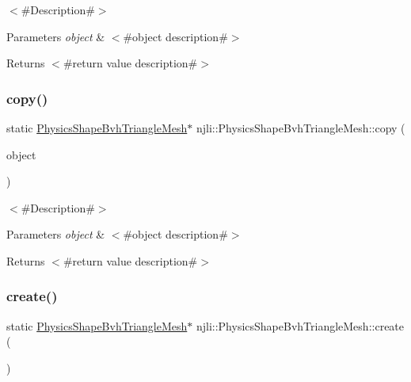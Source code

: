 $<$\#\+Description\#$>$


\begin{DoxyParams}{Parameters}
{\em object} & $<$\#object description\#$>$\\
\hline
\end{DoxyParams}
\begin{DoxyReturn}{Returns}
$<$\#return value description\#$>$ 
\end{DoxyReturn}
\mbox{\label{classnjli_1_1_physics_shape_bvh_triangle_mesh_aea4dfccb4d3f2e77de449eb2ffa18390}} 
\subsubsection{\texorpdfstring{copy()}{copy()}}
{\footnotesize\ttfamily static \mbox{\hyperlink{classnjli_1_1_physics_shape_bvh_triangle_mesh}{Physics\+Shape\+Bvh\+Triangle\+Mesh}}$\ast$ njli\+::\+Physics\+Shape\+Bvh\+Triangle\+Mesh\+::copy (\begin{DoxyParamCaption}\item[{const \mbox{\hyperlink{classnjli_1_1_physics_shape_bvh_triangle_mesh}{Physics\+Shape\+Bvh\+Triangle\+Mesh}} \&}]{object }\end{DoxyParamCaption})\hspace{0.3cm}{\ttfamily [static]}}

$<$\#\+Description\#$>$


\begin{DoxyParams}{Parameters}
{\em object} & $<$\#object description\#$>$\\
\hline
\end{DoxyParams}
\begin{DoxyReturn}{Returns}
$<$\#return value description\#$>$ 
\end{DoxyReturn}
\mbox{\label{classnjli_1_1_physics_shape_bvh_triangle_mesh_ae47d76be18e0603117b366f64c73773a}} 
\subsubsection{\texorpdfstring{create()}{create()}\hspace{0.1cm}{\footnotesize\ttfamily [1/2]}}
{\footnotesize\ttfamily static \mbox{\hyperlink{classnjli_1_1_physics_shape_bvh_triangle_mesh}{Physics\+Shape\+Bvh\+Triangle\+Mesh}}$\ast$ njli\+::\+Physics\+Shape\+Bvh\+Triangle\+Mesh\+::create (\begin{DoxyParamCaption}{ }\end{DoxyParamCaption})\hspace{0.3cm}{\ttfamily [static]}}

